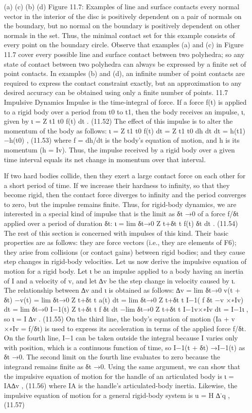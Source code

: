 (a) (c) (b) (d) Figure 11.7: Examples of line and surface contacts every normal vector in the interior of the disc is positively dependent on a pair of normals on the boundary, but no normal on the boundary is positively dependent on other normals in the set. Thus, the minimal contact set for this example consists of every point on the boundary circle. Observe that examples (a) and (c) in Figure 11.7 cover every possible line and surface contact between two polyhedra; so any state of contact between two polyhedra can always be expressed by a finite set of point contacts. In examples (b) and (d), an infinite number of point contacts are required to express the contact constraint exactly, but an approximation to any desired accuracy can be obtained using only a finite number of points. 11.7 Impulsive Dynamics Impulse is the time-integral of force. If a force f(t) is applied to a rigid body over a period from t0 to t1, then the body receives an impulse, ι, given by ι = Z t1 t0 f(t) dt . (11.52) The effect of this impulse is to alter the momentum of the body as follows: ι = Z t1 t0 f(t) dt = Z t1 t0 dh dt dt = h(t1) −h(t0) , (11.53) where f = dh/dt is the body’s equation of motion, and h is its momentum (h = Iv). Thus, the impulse received by a rigid body over a given time interval equals its net change in momentum over that interval.

If two hard bodies collide, then they exert a large contact force on each other for a short period of time. If we increase their hardness to infinity, so that they become rigid, then the contact force diverges to infinity and the period converges to zero, but the impulse remains finite. Thus, for rigid-body dynamics, we are interested in a special kind of impulse that is the limit as δt →0 of a force f/δt applied over a period of duration δt: ι = lim δt→0 Z t+δt t f(t) δt dt . (11.54) The rest of this section is concerned with impulses of this kind. Their basic properties are as follows: they are force vectors (i.e., they are elements of F6); they arise from collisions (or contact gains) between rigid bodies; and they cause step changes in rigid-body velocities. Let us now derive the impulsive equation of motion for a rigid body. Let ι be an impulse applied to a body having an inertia of I and a velocity of v, and let ∆v be the step change in velocity caused by ι. The relationship between ∆v and ι is obtained as follows: ∆v = lim δt→0 v(t + δt) −v(t) = lim δt→0 Z t+δt t a(t) dt = lim δt→0 Z t+δt t I−1( f δt −v ×∗Iv) dt = lim δt→0 I−1(t) Z t+δt t f δt dt −lim δt→0 Z t+δt t I−1v×∗Iv dt = I−1ι , so ι = I ∆v . (11.55) On the third line, the body’s equation of motion (Ia + v ×∗Iv = f/δt) is used to express its acceleration in terms of the applied force f/δt. On the fourth line, I−1 can be taken outside the integral because I varies only with position, which is a continuous function of time, so I−1(t + δt) →I−1(t) as δt →0. The second limit on the fourth line evaluates to zero because the integrand remains finite as δt →0. Using the same argument, we can show that the impulsive equation of motion for the handle of an articulated body is ι = IA∆v , (11.56) where IA is the handle’s articulated-body inertia. Likewise, the impulsive equation of motion for a general rigid-body system is u = H ∆˙q , (11.57)

